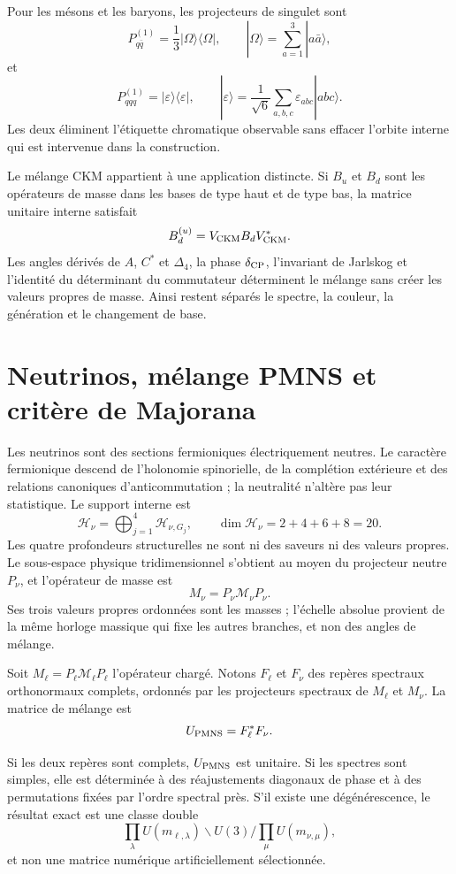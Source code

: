 Pour les mésons et les baryons, les projecteurs de singulet sont
\[
 P_{q\bar q}^{(1)}
 =\frac1{3}|\Omega\rangle\langle\Omega|,
 \qquad
 |\Omega\rangle=\sum_{a=1}^{3}|a\bar a\rangle,
\]
et
\[
 P_{qqq}^{(1)}
 =|\varepsilon\rangle\langle\varepsilon|,
 \qquad
 |\varepsilon\rangle
 =\frac1{\sqrt6}\sum_{a,b,c}\varepsilon_{abc}|abc\rangle.
\]
Les deux éliminent l'étiquette chromatique observable sans effacer l'orbite interne
qui est intervenue dans la construction.

Le mélange CKM appartient à une application distincte. Si \(B_u\) et \(B_d\) sont les
opérateurs de masse dans les bases de type haut et de type bas, la matrice unitaire
interne satisfait
\[
 B_d^{(u)}=V_{\rm CKM} B_d V_{\rm CKM}^*.
\]
Les angles dérivés de \(A\), \(C^*\) et \(\Delta_4\), la phase
\(\delta_{\rm CP}\), l'invariant de Jarlskog et l'identité du déterminant
du commutateur déterminent le mélange sans créer les valeurs propres de masse. Ainsi
restent séparés le spectre, la couleur, la génération et le changement de base.

\section{Neutrinos, mélange PMNS et critère de Majorana}

Les neutrinos sont des sections fermioniques électriquement neutres. Le
caractère fermionique descend de l'holonomie spinorielle, de la complétion extérieure et
des relations canoniques d'anticommutation ; la neutralité n'altère pas leur
statistique. Le support interne est
\[
 \mathcal H_\nu=
 \bigoplus_{j=1}^{4}\mathcal H_{\nu,G_j},
 \qquad
 \dim\mathcal H_\nu=2+4+6+8=20.
\]
Les quatre profondeurs structurelles ne sont ni des saveurs ni des valeurs propres. Le
sous-espace physique tridimensionnel s'obtient au moyen du projecteur neutre
\(P_\nu\), et l'opérateur de masse est
\[
 M_\nu=P_\nu\mathcal M_\nu P_\nu.
\]
Ses trois valeurs propres ordonnées sont les masses ; l'échelle absolue provient de la
même horloge massique qui fixe les autres branches, et non des angles de mélange.

Soit \(M_\ell=P_\ell\mathcal M_\ell P_\ell\) l'opérateur chargé. Notons
\(F_\ell\) et \(F_\nu\) des repères spectraux orthonormaux complets, ordonnés par
les projecteurs spectraux de \(M_\ell\) et \(M_\nu\). La matrice de mélange est
\[
 U_{\rm PMNS}=F_\ell^*F_\nu.
\]

\begin{theorem}
Si les deux repères sont complets, \(U_{\rm PMNS}\) est unitaire. Si les
spectres sont simples, elle est déterminée à des réajustements diagonaux de phase et à des
permutations fixées par l'ordre spectral près. S'il existe une dégénérescence, le
résultat exact est une classe double
\[
 \prod_\lambda U(m_{\ell,\lambda})
 \backslash U(3) /
 \prod_\mu U(m_{\nu,\mu}),
\]
et non une matrice numérique artificiellement sélectionnée.
\end{theorem}

